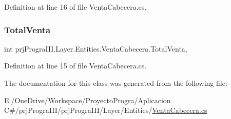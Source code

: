 Definition at line 16 of file Venta\+Cabecera.\+cs.

\hypertarget{classprj_progra_i_i_i_1_1_layer_1_1_entities_1_1_venta_cabecera_a3f92bd1e1a8d703eaf1e4fde0d9c9ec5}{}\label{classprj_progra_i_i_i_1_1_layer_1_1_entities_1_1_venta_cabecera_a3f92bd1e1a8d703eaf1e4fde0d9c9ec5} 
\subsubsection{\texorpdfstring{Total\+Venta}{TotalVenta}}
{\footnotesize\ttfamily int prj\+Progra\+I\+I\+I.\+Layer.\+Entities.\+Venta\+Cabecera.\+Total\+Venta\hspace{0.3cm}{\ttfamily [get]}, {\ttfamily [set]}}



Definition at line 15 of file Venta\+Cabecera.\+cs.



The documentation for this class was generated from the following file\+:\begin{DoxyCompactItemize}
\item 
E\+:/\+One\+Drive/\+Workspace/\+Proyecto\+Progra/\+Aplicacion C\#/prj\+Progra\+I\+I\+I/prj\+Progra\+I\+I\+I/\+Layer/\+Entities/\hyperlink{_venta_cabecera_8cs}{Venta\+Cabecera.\+cs}\end{DoxyCompactItemize}
